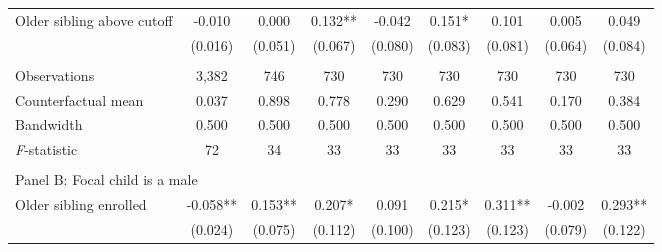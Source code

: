 \begin{table}[!htbp]
{{\begin{tabular}{lcccccccc}
Older sibling above cutoff&      -0.010   &       0.000   &       0.132** &      -0.042   &       0.151*  &       0.101   &       0.005   &       0.049   \\
                    &     (0.016)   &     (0.051)   &     (0.067)   &     (0.080)   &     (0.083)   &     (0.081)   &     (0.064)   &     (0.084)   \\
                    &               &               &               &               &               &               &               &               \\
Observations        &       3,382   &         746   &         730   &         730   &         730   &         730   &         730   &         730   \\
Counterfactual mean &       0.037   &       0.898   &       0.778   &       0.290   &       0.629   &       0.541   &       0.170   &       0.384   \\
Bandwidth           &       0.500   &       0.500   &       0.500   &       0.500   &       0.500   &       0.500   &       0.500   &       0.500   \\
\textit{F}-statistic&          72   &          34   &          33   &          33   &          33   &          33   &          33   &          33   \\
 
&  &  &  & & & & & \\
\multicolumn{10}{l}{Panel B: Focal child is a male} \\
Older sibling enrolled&      -0.058** &       0.153** &       0.207*  &       0.091   &       0.215*  &       0.311** &      -0.002   &       0.293** \\
                    &     (0.024)   &     (0.075)   &     (0.112)   &     (0.100)   &     (0.123)   &     (0.123)   &     (0.079)   &     (0.122)   \\
 

\end{tabular}}}
\end{table}
